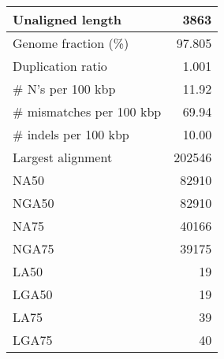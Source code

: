 \documentclass[12pt,a4paper]{article}
\begin{document}
\begin{table}[ht]
\begin{center}
\begin{tabular}{|l*{1}{|r}|}
Unaligned length & 3863 \\ \hline
Genome fraction (\%) & 97.805 \\ \hline
Duplication ratio & 1.001 \\ \hline
\# N's per 100 kbp & 11.92 \\ \hline
\# mismatches per 100 kbp & 69.94 \\ \hline
\# indels per 100 kbp & 10.00 \\ \hline
Largest alignment & 202546 \\ \hline
NA50 & 82910 \\ \hline
NGA50 & 82910 \\ \hline
NA75 & 40166 \\ \hline
NGA75 & 39175 \\ \hline
LA50 & 19 \\ \hline
LGA50 & 19 \\ \hline
LA75 & 39 \\ \hline
LGA75 & 40 \\ \hline
\end{tabular}
\end{center}
\end{table}
\end{document}
